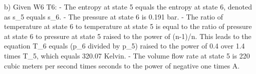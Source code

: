 b) Given W6 T6:
- The entropy at state 5 equals the entropy at state 6, denoted as s_5 equals s_6.
- The pressure at state 6 is 0.191 bar.
- The ratio of temperature at state 6 to temperature at state 5 is equal to the ratio of pressure at state 6 to pressure at state 5 raised to the power of (n-1)/n. This leads to the equation T_6 equals (p_6 divided by p_5) raised to the power of 0.4 over 1.4 times T_5, which equals 320.07 Kelvin.
- The volume flow rate at state 5 is 220 cubic meters per second times seconds to the power of negative one times A.